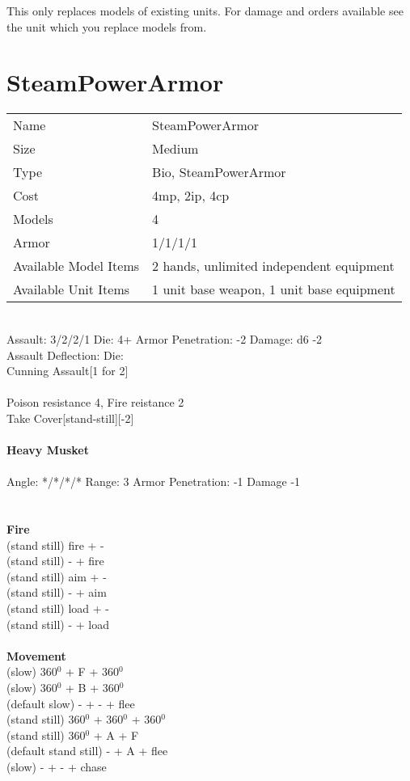 This only replaces models of existing units. For damage and orders available see the unit which you replace models from.



\pagebreak

\section{ SteamPowerArmor }

\begin{tabular}{ll}
  Name & SteamPowerArmor \\
  Size & Medium\\
  Type & Bio, SteamPowerArmor\\
  Cost & 4mp, 2ip, 4cp\\
  Models & 4\\
  Armor & 1/1/1/1\\
  Available Model Items & 2 hands, unlimited independent equipment \\
  Available Unit Items & 1 unit base weapon, 1 unit base equipment \\
\end{tabular}

\ \\
Assault: 3/2/2/1 Die: 4+ Armor Penetration: -2 Damage: d6 -2 \\
Assault Deflection:  Die: \\
\indent Cunning Assault[1 for 2] \\
\ \\
Poison resistance 4, Fire reistance 2\\ Take Cover[stand-still][-2]
\ \\
\ \\
{\bf Heavy Musket } \\
\ \\
Angle: */*/*/* Range: 3 Armor Penetration: -1 Damage -1 \\
\indent  \\





\ \\ {\bf Fire } \\
(stand still) fire + - \\
(stand still) - + fire \\
(stand still) aim + - \\
(stand still) - + aim \\
(stand still) load + - \\
(stand still) - + load \\
\ \\ {\bf Movement } \\
(slow) 360$^0$ + F + 360$^0$ \\
(slow) 360$^0$ + B + 360$^0$ \\
(default slow) - + - + flee \\
(stand still) 360$^0$ + 360$^0$ + 360$^0$ \\
(stand still) 360$^0$ + A + F \\
(default stand still) - + A + flee \\
(slow) - + - + chase \\



